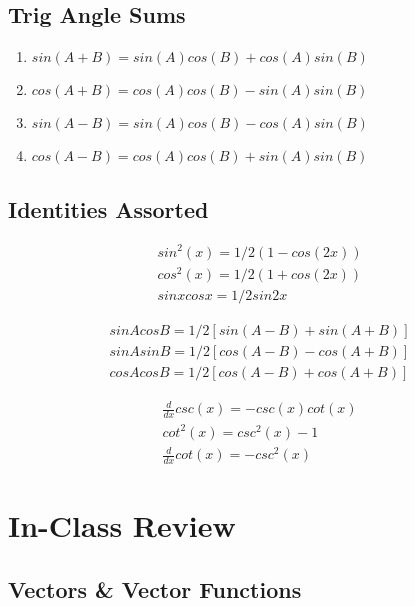 \documentclass[a4paper,12pt]{report}
\begin{document}
\section{Trig Angle Sums}
\begin{enumerate}
\item $sin(A+B) = sin(A)cos(B) + cos(A)sin(B)$
\item $cos(A+B) = cos(A)cos(B) - sin(A)sin(B)$
\item $sin(A-B) = sin(A)cos(B) - cos(A)sin(B)$
\item $cos(A-B) = cos(A)cos(B) + sin(A)sin(B)$
\end{enumerate}

\section{Identities Assorted}
\begin{eqnarray}
sin^2 (x) = 1/2 (1-cos(2x)) \\
cos^2 (x) = 1/2 (1+cos(2x)) \\
sinxcosx = 1/2 sin2x
\end{eqnarray}

\begin{eqnarray}
sin A cos B = 1/2 [sin(A-B) + sin(A+B)] \\
sin A sin B = 1/2 [cos(A-B) - cos(A+B)] \\
cos A cos B = 1/2 [cos(A-B) + cos(A+B)]
\end{eqnarray}

\begin{eqnarray}
\frac{d}{dx} csc(x) = -csc(x)cot(x) \\
cot^2(x) = csc^2(x) - 1 \\
\frac{d}{dx} cot(x) = -csc^2(x)
\end{eqnarray}




\chapter{In-Class Review}
\section{Vectors \& Vector Functions}
\end{document}
